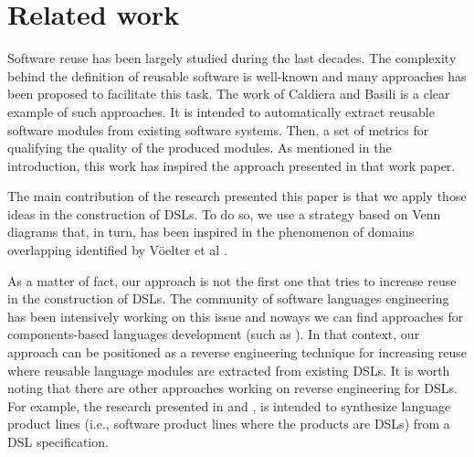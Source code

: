 \section{Related work}
\label{sec:relatedwork}

Software reuse has been largely studied during the last decades. The complexity behind the definition of reusable software is well-known and many approaches has been proposed to facilitate this task. The work of Caldiera and Basili \cite{Caldiera:1991} is a clear example of such approaches. It is intended to automatically extract reusable software modules from existing software systems. Then, a set of metrics for qualifying the quality of the produced modules. As mentioned in the introduction, this work has inspired the approach presented in that work paper. 

The main contribution of the research presented this paper is that we apply those ideas in the construction of DSLs. To do so, we use a strategy based on Venn diagrams that, in turn, has been inspired in the phenomenon of domains overlapping identified by V\"oelter et al \cite[p. 60-61]{voelter:2013}.

As a matter of fact, our approach is not the first one that tries to increase reuse in the construction of DSLs. The community of software languages engineering has been intensively working on this issue and noways we can find approaches for components-based languages development (such as \cite{Mernik:2013,Rumpe:2010}). In that context, our approach can be positioned as a reverse engineering technique for increasing reuse where reusable language modules are extracted from existing DSLs. It is worth noting that there are other approaches working on reverse engineering for DSLs. For example, the research presented in \cite{vacchi:2014} and \cite{Kuhn:2015}, is intended to synthesize language product lines (i.e., software product lines where the products are DSLs) from a DSL specification. 

 

